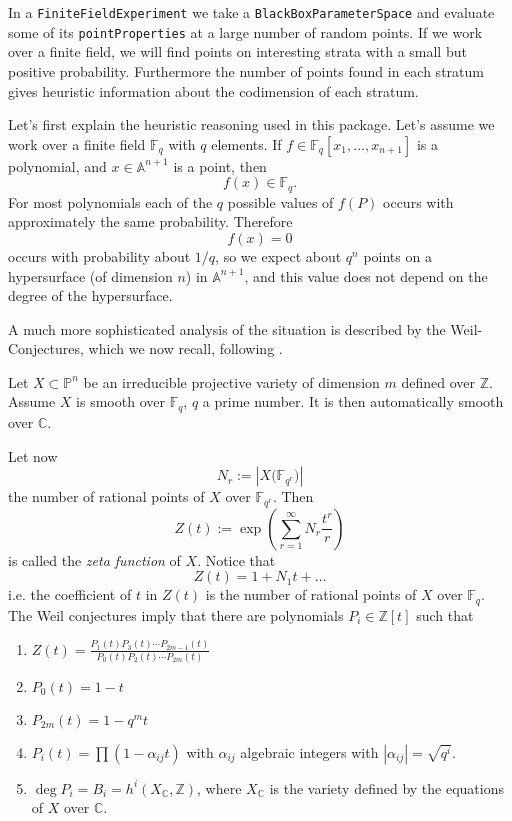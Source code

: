 \documentclass[12pt,a4paper]{amsart}
\theoremstyle{plain}
\theoremstyle{definition}
\newcommand{\FF}{\mathbb F}
\newcommand{\ZZ}{\mathbb Z}
\renewcommand{\AA}{\mathbb A}
\newcommand{\CC}{\mathbb C}
\newcommand{\PP}{\mathbb P}
\begin{document}
In a {\tt FiniteFieldExperiment} we take a {\tt BlackBoxParameterSpace} and evaluate some of its {\tt pointProperties} at a large number of random points. If we work over a finite field, we will find points on interesting strata with a small but positive probability. Furthermore the number of points found in each stratum gives heuristic information about the codimension of each stratum.

Let's first explain the heuristic reasoning used in this package. Let's assume we work over a finite field $\FF_q$ with $q$ elements. If $f \in \FF_q[x_1,\dots,x_{n+1}]$ is a polynomial, and $x \in \AA^{n+1}$ is a point, then
\[
	f(x) \in \FF_q.
\]
For most polynomials each of the $q$ possible values of $f(P)$ occurs with approximately the same probability. Therefore 
\[
	f(x) = 0
\]
occurs with probability about $1/q$, so we expect about $q^{n}$ points on a hypersurface (of dimension $n$) in $\AA^{n+1}$, and this value does not depend on the degree of the hypersurface.

A much more sophisticated analysis of the situation is described by the Weil-Conjectures, which we now recall, following \cite[Appendix C]{Hartshorne}.

Let $X \subset \PP^n$ be an irreducible projective variety of dimension $m$ defined over $\ZZ$. Assume $X$ is smooth over $\FF_q$, $q$ a prime number. It is then automatically smooth over $\CC$. 

Let now
\[
	N_r := \left| X\bigl(\FF_{q^r}\bigr) \right|
\]
the number of rational points of $X$ over $\FF_{q^r}$. Then 
\[
	Z(t) := \exp \left( \sum_{r=1}^{\infty} N_r \frac{t^r}{r} \right)
\]
is called the {\sl zeta function} of $X$. Notice that
\[
	Z(t) = 1 + N_1 t + \dots
\]
i.e. the coefficient of $t$ in $Z(t)$ is the number of rational points of $X$ over $\FF_q$.  The Weil conjectures imply that there are polynomials $P_i \in \ZZ[t]$ such that
\begin{enumerate}
\item $Z(t) = \frac{P_1(t) P_3(t) \cdots P_{2m-1}(t)}{P_0(t)P_2(t) \cdots P_{2m}(t)}$
\item $P_0(t) = 1 - t$
\item $P_{2m}(t) = 1 - q^m t$
\item $P_{i}(t) = \prod (1 - \alpha_{ij} t)$ with $\alpha_{ij}$ algebraic integers with $|\alpha_{ij}| = \sqrt{q^i}$.
\item $\deg P_{i} = B_i = h^i(X_{\CC},\ZZ)$, where $X_\CC$ is the variety defined by the equations of $X$ over $\CC$.
\end{enumerate}
\end{document}

